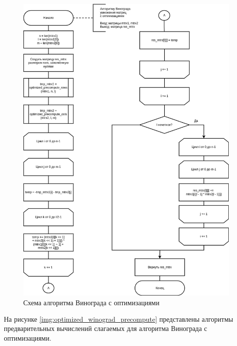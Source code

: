 \begin{figure}[H]
	\begin{center}
		\includegraphics[scale=0.56]{img/optimized_winograd.png}
	\end{center}
	\captionsetup{justification=centering}
	\caption{Схема алгоритма Винограда с оптимизациями}
	\label{img:optimized_winograd}
\end{figure}

На рисунке \ref{img:optimized_winograd_precompute} представлены алгоритмы предварительных вычислений слагаемых для алгоритма Винограда с оптимизациями.

